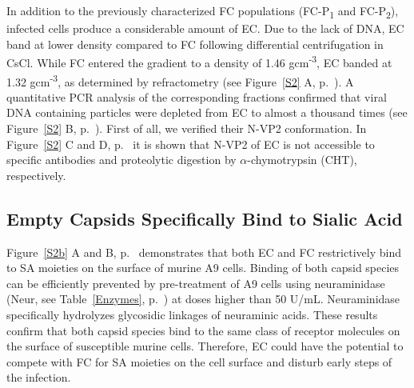 In addition to the previously characterized FC populations (FC-P\textsubscript{1} and FC-P\textsubscript{2}), infected cells produce a considerable amount of EC. Due to the lack of DNA, EC band at lower density compared to FC following differential centrifugation in CsCl. While FC entered the gradient to a density of 1.46 gcm\textsuperscript{-3}, EC banded at 1.32 gcm\textsuperscript{-3}, as determined by refractometry (see Figure~\ref{S2} A, p.~\pageref{S2}). A quantitative PCR analysis of the corresponding fractions confirmed that viral DNA containing particles were depleted from EC to almost a thousand times (see Figure~\ref{S2} B, p.~\pageref{S2}). First of all, we verified their N-VP2 conformation. In Figure~\ref{S2} C and D, p.~\pageref{S2} it is shown that N-VP2 of EC is not accessible to specific antibodies and proteolytic digestion by $\alpha$-chymotrypsin (CHT), respectively. 

\subsection{Empty Capsids Specifically Bind to Sialic Acid}

Figure~\ref{S2b} A and B, p.~\pageref{S2b} demonstrates that both EC and FC restrictively bind to SA moieties on the surface of murine A9 cells. Binding of both capsid species can be efficiently prevented by pre-treatment of A9 cells using neuraminidase (Neur, see Table~\ref{Enzymes}, p.~\pageref{Enzymes}) at doses higher than 50 U/mL. Neuraminidase specifically hydrolyzes glycosidic linkages of neuraminic acids. These results confirm that both capsid species bind to the same class of receptor molecules on the surface of susceptible murine cells. Therefore, EC could have the potential to compete with FC for SA moieties on the cell surface and disturb early steps of the infection.            

\renewcommand\thempfootnote{\arabic{mpfootnote}}


